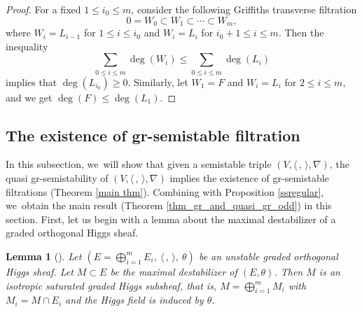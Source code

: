 \documentclass[JEP,XML,SOM,Unicode,published]{cedram}
\newcommand{\grsemistable}{gr\nobreakdash-semi\-stable\xspace}
\theoremstyle{plain}
\newtheorem{lem}[thm]{Lemma}
\theoremstyle{definition}
\begin{document}
\begin{proof}
For a fixed $1\leq i_0\leq m$, consider the following Griffiths transverse filtration
\[
0=W_0\subset W_1\subset \cdots\subset W_m,
\]
where $W_i= L_{i-1}$ for $1\leq i\leq i_0$ and $W_i= L_i$ for $i_0+1\leq i\leq m$. Then the inequality
\[
\sum_{0\leq i\leq m}\deg(W_i)\leqslant\sum_{0\leq i\leq m}\deg(L_i)
\]
implies that $\deg(L_{i_0})\geq 0$. Similarly, let $W_1=F$ and $W_i=L_i$ for $2\leq i\leq m$, and we get $\deg(F)\leq \deg(L_1)$.
\end{proof} 

\subsection{The existence of \texorpdfstring{\protect\grsemistable}{grsemistable} filtration}\label{subsect_exist}

In this subsection, we~will show that given a semistable triple $(V, \langle \,, \, \rangle, \nabla)$, the quasi gr-semistability of $(V, \langle \,, \, \rangle, \nabla)$ implies the existence of \grsemistable filtrations (Theorem \ref{main thm}). Combining with Proposition \ref{ssregular}, we~obtain the main result (Theorem \ref{thm_gr_and_quasi_gr_odd}) in this section. First, let us begin with a lemma about the maximal destabilizer of a graded orthogonal Higgs sheaf.

\begin{lem}[{\cite[Lem.\,A.6]{LSZ19}}]\label{destabilizer}
Let $(E=\mathop{\bigoplus}_{i=1}^{m} E_i,\ \langle \,, \, \rangle,\ \theta)$ be an unstable graded orthogonal Higgs sheaf. Let $M\subset E$ be the maximal destabilizer of $(E,\theta)$. Then $M$ is an isotropic saturated graded Higgs subsheaf, that is, $M=\mathop{\bigoplus}_{i=1}^{m} M_i$ with $M_i=M\cap E_i$ and the Higgs field is induced by $\theta$.
\end{lem}
\end{document}
